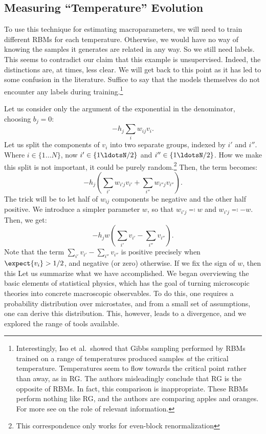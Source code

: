 \subsection{Measuring ``Temperature'' Evolution}




    To use this technique for estimating macroparameters, we
will need to train different RBMs for each temperature. Otherwise, we
would have no way of knowing the samples it generates are related in
any way. So we still need labels.  This seems to contradict our claim
that this example is unsupervised.  Indeed, the distinctions are, at
times, less clear. We will get back to this point as it has led to
some confusion in the literature. Suffice to say that the models
themselves do not encounter any labels during
training.\footnote{Interestingly, Iso et al.\ showed that Gibbs
  sampling performed by RBMs trained on a range of temperatures
  produced samples \textit{at} the critical temperature. Temperatures
  seem to flow towards the critical point rather than away, as in
  RG\@. The authors misleadingly conclude that RG is the opposite of
  RBMs. In fact, this comparison is inappropriate. These RBMs perform
  nothing like RG, and the authors are comparing apples and
  oranges. For more see  on the role of relevant
  information.}


Let us consider only the argument of the exponential in the
denominator, choosing $b_j=0$:
\begin{equation}%
  -h_j\sum_i w_{ij} v_i.
\end{equation}%
Let us split the components of $v_i$ into two separate groups, indexed
by $i'$ and $i''$. Where $i \in \{1\ldots N\}$, now
$i'\in\{1\ldotsN/2\}$ and $i''\in\{1\ldotsN/2\}$. How we make this
split is not important, it could be purely random.\footnote{This
  correspondence only works for even-block renormalization} Then, the
term becomes:
\begin{equation}%
  -h_j(\sum_{i'} w_{i'j} v_{i'} +\sum_{i''} w_{i''j} v_{i''}).
\end{equation}%
The trick will be to let half of $w_{ij}$ components be negative and
the other half positive.  We introduce a simpler parameter $w$, so
that $w_{i'j}\eqcolon w$ and $w_{i'j}\eqcolon -w$.  Then, we get:
\begin{equation}%
  -h_j w(\sum_{i'}v_{i'} -\sum_{i''} v_{i''}).
\end{equation}%
Note that the term $\sum_{i'}v_{i'} -\sum_{i''} v_{i''}$ is positive
precisely when $\expect{v_i}>1/2$, and negative (or zero) otherwise.
If we fix the sign of $w$, then this
Let us summarize what we have accomplished.  We began overviewing the
basic elements of statistical physics, which has the goal of turning
microscopic theories into concrete macroscopic observables. To do
this, one requires a probability distribution over microstates, and
from a small set of assumptions, one can derive this
distribution. This, however, leads to a divergence, and we explored
the range of tools available.

